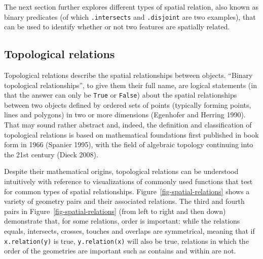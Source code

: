 \documentclass[
  letterpaper,
]{krantz}
\begin{document}
The next section further explores different types of spatial relation,
also known as binary predicates (of which \texttt{.intersects} and
\texttt{.disjoint} are two examples), that can be used to identify
whether or not two features are spatially related.

\subsection{Topological relations}\label{sec-topological-relations}

Topological relations describe the spatial relationships between
objects. ``Binary topological relationships'', to give them their full
name, are logical statements (in that the answer can only be
\texttt{True} or \texttt{False}) about the spatial relationships between
two objects defined by ordered sets of points (typically forming points,
lines and polygons) in two or more dimensions (Egenhofer and Herring
1990). That may sound rather abstract and, indeed, the definition and
classification of topological relations is based on mathematical
foundations first published in book form in 1966 (Spanier 1995), with
the field of algebraic topology continuing into the 21st century (Dieck
2008).

Despite their mathematical origins, topological relations can be
understood intuitively with reference to visualizations of commonly used
functions that test for common types of spatial relationships.
Figure~\ref{fig-spatial-relations} shows a variety of geometry pairs and
their associated relations. The third and fourth pairs in
Figure~\ref{fig-spatial-relations} (from left to right and then down)
demonstrate that, for some relations, order is important: while the
relations equals, intersects, crosses, touches and overlaps are
symmetrical, meaning that if \texttt{x.relation(y)} is true,
\texttt{y.relation(x)} will also be true, relations in which the order
of the geometries are important such as contains and within are not.
\end{document}
